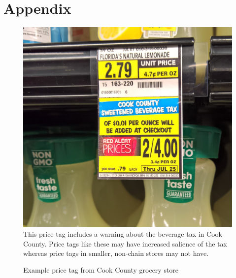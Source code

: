 \documentclass[12pt]{article}
\begin{document}
\clearpage
\section*{Appendix}

\renewcommand{\thesubsection}{\Alph{subsection}}
\setcounter{table}{0}
\renewcommand{\thetable}{A\arabic{table}}
\setcounter{figure}{0}
\renewcommand{\thefigure}{A\arabic{figure}}

\begin{figure}[t]\centering
  \caption{Example price tag from Cook County grocery store} \label{pricetag}
	\includegraphics[width = \textwidth]{../figures/pricetag.jpg}
	\footnotesize This price tag includes a warning about the beverage tax in Cook County. Price tags like these may have increased salience of the tax whereas price tags in smaller, non-chain stores may not have.
\end{figure}
\end{document}
